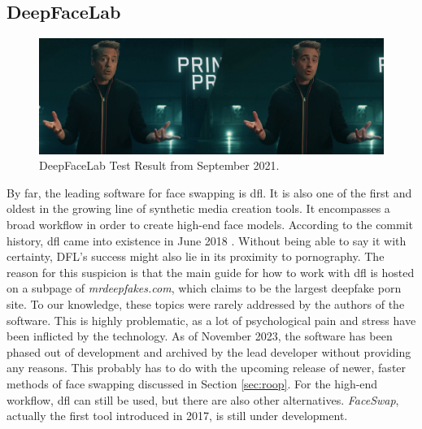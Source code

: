 \documentclass[
  a4paper,  %
  twoside,  %
  bibliography=totoc,
  headsepline,
  cleardoublepage=empty,
  parskip=half,
  draft=false
]{scrbook}
\begin{document}
\subsection{DeepFaceLab}
\begin{figure}[h]
  \centering
  \includegraphics[width=1\textwidth]{./graphics/dfl-demo.png}
  \caption{DeepFaceLab Test Result from September 2021.}
  \label{fig:dfl-sample}
\end{figure}
By far, the leading software for face swapping is \gls{dfl}. It is also one of the first and oldest in the growing line of synthetic media creation tools. It encompasses a broad workflow in order to create high-end face models. According to the commit history, \gls{dfl} came into existence in June 2018 \cite{iperovCommitsIperovDeepFaceLab}. Without being able to say it with certainty, DFL's success might also lie in its proximity to pornography. The reason for this suspicion is that the main guide for how to work with \gls{dfl} is hosted on a subpage of \textit{mrdeepfakes.com}, which claims to be the largest deepfake porn site. To our knowledge, these topics were rarely addressed by the authors of the software. This is highly problematic, as a lot of psychological pain and stress have been inflicted by the technology. As of November 2023, the software has been phased out of development and archived by the lead developer without providing any reasons. This probably has to do with the upcoming release of newer, faster methods of face swapping discussed in Section \ref{sec:roop}. For the high-end workflow, \gls{dfl} can still be used, but there are also other alternatives. \textit{FaceSwap}, actually the first tool introduced in 2017, is still under development.
\end{document}
